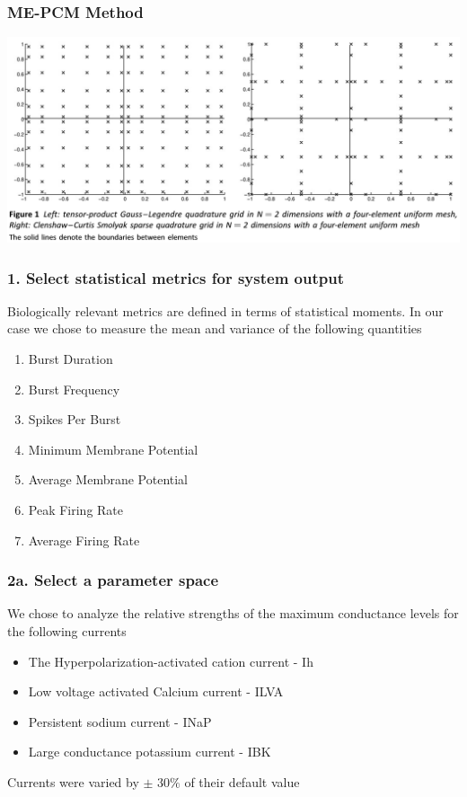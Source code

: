 \documentclass{beamer}
\theoremstyle{plain}
\theoremstyle{definition}
\begin{document}
 \begin{frame}\frametitle{ME-PCM Method}
   \begin{center}
     \includegraphics[scale = .25]{grid.png}
   \end{center}
 \end{frame}

 \begin{frame}\frametitle{1. Select statistical metrics for system output}
   Biologically relevant metrics are defined in terms of statistical moments. In our case we chose to measure the mean and variance of the following quantities
   \begin{enumerate}
     \item Burst Duration
     \item Burst Frequency
     \item Spikes Per Burst
     \item Minimum Membrane Potential
     \item Average Membrane Potential
     \item Peak Firing Rate
     \item Average Firing Rate
   \end{enumerate}
 \end{frame}

\begin{frame}\frametitle{2a. Select a parameter space}
  We chose to analyze the relative strengths of the maximum conductance levels for the following currents
 \begin{itemize}
   \item The Hyperpolarization-activated cation current - Ih
   \item Low voltage activated Calcium current - ILVA
   \item Persistent sodium current - INaP
   \item Large conductance potassium current - IBK
 \end{itemize}

 Currents were varied by $\pm$ $30\%$ of their default value
\end{frame}
\end{document}
